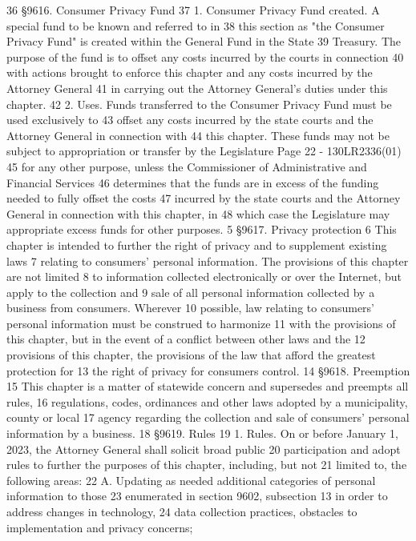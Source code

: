 36 §9616. Consumer Privacy Fund
37 1. Consumer Privacy Fund created. A special fund to be known and referred to in
38 this section as "the Consumer Privacy Fund" is created within the General Fund in the State
39 Treasury. The purpose of the fund is to offset any costs incurred by the courts in connection
40 with actions brought to enforce this chapter and any costs incurred by the Attorney General
41 in carrying out the Attorney General's duties under this chapter.
42 2. Uses. Funds transferred to the Consumer Privacy Fund must be used exclusively to
43 offset any costs incurred by the state courts and the Attorney General in connection with
44 this chapter. These funds may not be subject to appropriation or transfer by the Legislature 
Page 22 - 130LR2336(01)
45 for any other purpose, unless the Commissioner of Administrative and Financial Services
46 determines that the funds are in excess of the funding needed to fully offset the costs
47 incurred by the state courts and the Attorney General in connection with this chapter, in
48 which case the Legislature may appropriate excess funds for other purposes.
5 §9617. Privacy protection
6 This chapter is intended to further the right of privacy and to supplement existing laws
7 relating to consumers' personal information. The provisions of this chapter are not limited
8 to information collected electronically or over the Internet, but apply to the collection and
9 sale of all personal information collected by a business from consumers. Wherever
10 possible, law relating to consumers' personal information must be construed to harmonize
11 with the provisions of this chapter, but in the event of a conflict between other laws and the
12 provisions of this chapter, the provisions of the law that afford the greatest protection for
13 the right of privacy for consumers control.
14 §9618. Preemption
15 This chapter is a matter of statewide concern and supersedes and preempts all rules,
16 regulations, codes, ordinances and other laws adopted by a municipality, county or local
17 agency regarding the collection and sale of consumers' personal information by a business.
18 §9619. Rules
19 1. Rules. On or before January 1, 2023, the Attorney General shall solicit broad public
20 participation and adopt rules to further the purposes of this chapter, including, but not
21 limited to, the following areas:
22 A. Updating as needed additional categories of personal information to those
23 enumerated in section 9602, subsection 13 in order to address changes in technology,
24 data collection practices, obstacles to implementation and privacy concerns;
